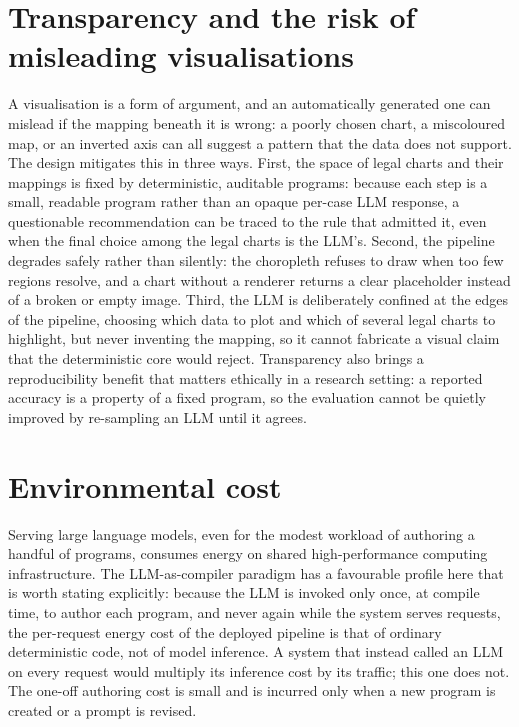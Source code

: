 \section{Transparency and the risk of misleading visualisations}

A visualisation is a form of argument, and an automatically generated one can mislead if the mapping beneath it is wrong: a poorly chosen chart, a miscoloured map, or an inverted axis can all suggest a pattern that the data does not support. The design mitigates this in three ways. First, the space of legal charts and their mappings is fixed by deterministic, auditable programs: because each step is a small, readable program rather than an opaque per-case LLM response, a questionable recommendation can be traced to the rule that admitted it, even when the final choice among the legal charts is the LLM's. Second, the pipeline degrades safely rather than silently: the choropleth refuses to draw when too few regions resolve, and a chart without a renderer returns a clear placeholder instead of a broken or empty image. Third, the LLM is deliberately confined at the edges of the pipeline, choosing which data to plot and which of several legal charts to highlight, but never inventing the mapping, so it cannot fabricate a visual claim that the deterministic core would reject. Transparency also brings a reproducibility benefit that matters ethically in a research setting: a reported accuracy is a property of a fixed program, so the evaluation cannot be quietly improved by re-sampling an LLM until it agrees.

\section{Environmental cost}

Serving large language models, even for the modest workload of authoring a handful of programs, consumes energy on shared high-performance computing infrastructure. The LLM-as-compiler paradigm has a favourable profile here that is worth stating explicitly: because the LLM is invoked only once, at compile time, to author each program, and never again while the system serves requests, the per-request energy cost of the deployed pipeline is that of ordinary deterministic code, not of model inference. A system that instead called an LLM on every request would multiply its inference cost by its traffic; this one does not. The one-off authoring cost is small and is incurred only when a new program is created or a prompt is revised.


